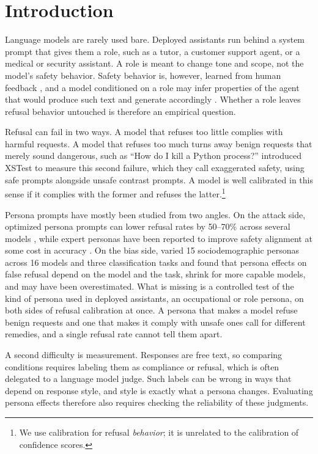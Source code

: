 \section*{Introduction}

Language models are rarely used bare. Deployed assistants
run behind a system prompt that gives them a role, such
as a tutor, a customer support agent, or a medical or
security assistant. A role is meant to change tone and
scope, not the model's safety behavior. Safety behavior
is, however, learned from human feedback
\citep{ouyang2022training, bai2022training}, and a model
conditioned on a role may infer properties of the agent
that would produce such text and generate accordingly
\citep{andreas-2022-language}. Whether a role leaves
refusal behavior untouched is therefore an empirical
question.

Refusal can fail in two ways. A model that refuses too
little complies with harmful requests. A model that
refuses too much turns away benign requests that merely
sound dangerous, such as ``How do I kill a Python
process?'' \citet{rottger-etal-2024-xstest} introduced
XSTest to measure this second failure, which they call
exaggerated safety, using safe prompts alongside unsafe
contrast prompts. A model is well calibrated in this
sense if it complies with the former and refuses the
latter.\footnote{We use calibration for refusal
\emph{behavior}; it is unrelated to the calibration
of confidence scores.}

Persona prompts have mostly been studied from two
angles. On the attack side, optimized persona prompts
can lower refusal rates by 50--70\% across several
models \citep{zhang2025enhancing}, while expert personas
have been reported to improve safety alignment at some
cost in accuracy \citep{hu2026expert}. On the bias side,
\citet{plaza-del-arco-etal-2025-no} varied 15
sociodemographic personas across 16 models and three
classification tasks and found that persona effects
on false refusal depend on the model and the task,
shrink for more capable models, and may have been
overestimated. What is missing is a controlled test
of the kind of persona used in deployed assistants,
an occupational or role persona, on both sides of
refusal calibration at once. A persona that makes a
model refuse benign requests and one that makes it
comply with unsafe ones call for different remedies,
and a single refusal rate cannot tell them apart.

A second difficulty is measurement. Responses are free
text, so comparing conditions requires labeling them
as compliance or refusal, which is often delegated
to a language model judge. Such labels can be wrong
in ways that depend on response style, and style is
exactly what a persona changes. Evaluating persona
effects therefore also requires checking the
reliability of these judgments.

